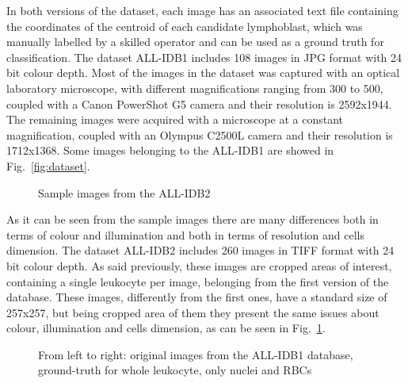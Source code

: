 \documentclass[final,a4paper,12pt,english]{UnicaPhdThesis3}
\begin{document}
	In both versions of the dataset, each image has an associated text file containing  the coordinates of the centroid of each candidate  lymphoblast, which was manually labelled by a skilled operator and can be used as a ground  truth for classification. The dataset ALL-IDB1 includes 108 images in JPG format with 24 bit colour depth. Most of the images in the dataset was captured with an optical laboratory microscope, with different magnifications ranging from 300 to 500, coupled with a Canon PowerShot G5 camera and their resolution is 2592x1944. The remaining images were acquired with a microscope at a constant magnification, coupled with an Olympus C2500L camera and their resolution is 1712x1368. Some images belonging to the ALL-IDB1 are showed in Fig.~\ref{fig:dataset}.
	
	\begin{figure}[!htbp]
		\centering
		\caption{\label{fig:dataset2}Sample images from the ALL-IDB2}
	\end{figure}
	
	As it can be seen from the sample images there are many differences both in terms of colour and illumination and both in terms of resolution and cells dimension. The dataset ALL-IDB2 includes 260 images in TIFF format with 24 bit colour depth. As said previously, these images are cropped areas of interest, containing a single leukocyte per image, belonging from the first version of the database. These images, differently from the first ones, have a standard size of 257x257, but being cropped area of them they present the same issues about colour, illumination and cells dimension, as can be seen in Fig.~\ref{fig:dataset2}.
	
	\begin{figure}[!htbp]
		\centering
		\caption{\label{fig:datasetgt1}From left to right: original images from the ALL-IDB1 database, ground-truth for whole leukocyte, only nuclei and RBCs}
	\end{figure}
	
\end{document}

